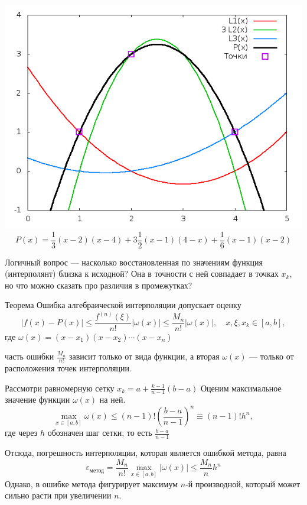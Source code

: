 \documentclass[professionalfonts,compress,unicode]{beamer}
\begin{document}
{
\center
\includegraphics[height=0.75\textheight]{lp.png}
$$
P(x) = \frac{1}{3}(x-2)(x-4) + 3\frac{1}{2}(x-1)(4-x) + \frac{1}{6}(x-1)(x-2)
$$
}

{
	Логичный вопрос --- насколько восстановленная по значениям функция (интерполянт)
	близка к исходной? Она в точности с ней совпадает в точках $x_k$, но что можно сказать 
	про различия в промежутках?
	\pause
	
	\begin{block}{Теорема}
	Ошибка алгебраической интерполяции допускает оценку
	$$
	\left| f(x) - P(x) \right| \leq \frac{f^{(n)}(\xi)}{n!}|\omega(x)| \leq \frac{M_n}{n!} |\omega(x)|, \quad x,\xi,x_k \in [a,b],
	$$
	где $\omega(x) = (x-x_1)(x-x_2)\cdots(x-x_n)$
	\end{block}
	\pause
	
	часть ошибки $\frac{M_n}{n!}$ зависит только от вида функции, а вторая $\omega(x)$ --- только от расположения точек интерполяции.
}

{
	Рассмотри равномерную сетку $x_k = a + \frac{k-1}{n-1} (b-a)$
	Оценим максимальное значение функции $\omega(x)$ на ней. 
	$$
	\max_{x \in [a,b]} \omega(x) \leq (n-1)! \left(\frac{b-a}{n-1}\right)^n \equiv (n-1)! h^n, 
	$$
	где через $h$ обозначен шаг сетки, то есть $\frac{b-a}{n-1}$
	\pause
	
	Отсюда, погрешность интерполяции, которая является ошибкой метода, равна
	$$
	\varepsilon_{\text{метод}} = \frac{M_n}{n!} \max_{x \in [a,b]}| \omega(x) |\leq \frac{M_n}{n} h^n
	$$
	Однако, в ошибке метода фигурирует максимум $n$-й производной, который может сильно расти при увеличении $n$.
}
\end{document}
